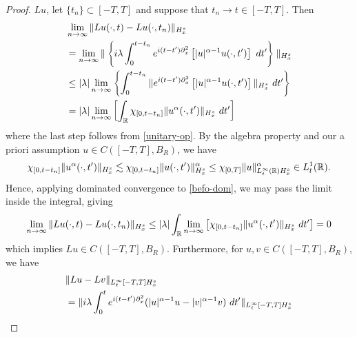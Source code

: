 \begin{proof}
$Lu$, let $\{t_n\} \subset [-T, T]$ and suppose that $t_n \to t \in [-T, 
T]$. Then
%
%
\begin{equation}
  \label{befo-dom}
  \begin{split}
    & \lim_{n \to \infty} \|Lu(\cdot, t) - Lu(\cdot, t_n)\|_{H^s_x} 
    \\
    & = \lim_{n \to \infty} \| \left \{ i \lambda \int_0^{t - t_n} e^{i(t  
    - t') \partial_x^2} \left [|u|^{\alpha -1}u( \cdot, t') \right ]
    \ dt'\right \} \|_{H^s_x}
    \\
    & \le |\lambda|
    \lim_{n \to \infty}  \left \{  \int_0^{t - t_n} \| e^{i(t  
    - t') \partial_x^2} \left [ |u|^{\alpha -1}u( \cdot, t') \right ]  
    \|_{H^s_x} \ dt' \right \}
    \\
    & = |\lambda|
    \lim_{n \to \infty}  \left[  \int_{\mathbb{R}} \chi_{[0, t-t_n]}
    \| u^{\alpha}(\cdot, t') \|_{H^s_x} \ dt' \right ]
  \end{split}
\end{equation}
%
%
where the last step follows from \eqref{unitary-op}. 
By the algebra property and our a priori
assumption $u \in C([-T, T], B_R )$, we have 
%
%
\begin{equation*}
  \begin{split}
    \chi_{[0,t-t_n]}	\|u^\alpha(\cdot, t')\|_{H^s_x}
    \lesssim \chi_{[0,t-t_n]} 	\|u(\cdot, t')\|_{H^s_x}^\alpha 
    \le \chi_{[0,T]}\|u\|^\alpha_{L^\infty_t(\mathbb{R}) H^s_x} \in 
    L^1_t(\mathbb{R}).
    \end{split}
\end{equation*}
%
%
%
%
Hence, applying dominated 
convergence to \eqref{befo-dom}, we may pass the limit inside the integral,  
giving
%
\begin{equation*}
  \begin{split}
    \lim_{n \to \infty} \|Lu(\cdot, t)  - Lu(\cdot, t_n)\|_{H^s_x} 
    \le |\lambda|
    \int_{\mathbb{R}} \lim_{n \to \infty} \left [ \chi_{[0, t-t_n]}
    \| u^{\alpha}(\cdot, t') \|_{H^s_x} \ dt' \right ]
    = 0
  \end{split}
\end{equation*}
%
%
which implies $Lu \in C([-T, T], B_R)$. Furthermore, for 
$u, v \in C([-T, T], B_R)$, we have
%
%
\begin{equation*}
  \begin{split}
    & \|Lu-Lv\|_{L^\infty_t[-T, T] H^s_x}
    \\
    & = \|i \lambda \int_0^t e^{i(t 
    -t')\p_x^2} (|u|^{\alpha - 1}u -|v|^{\alpha -1} v ) \ dt'
    \|_{L^\infty_t[-T, T] H^s_x}
    \\

\end{split}
\end{equation*}
\end{proof}
